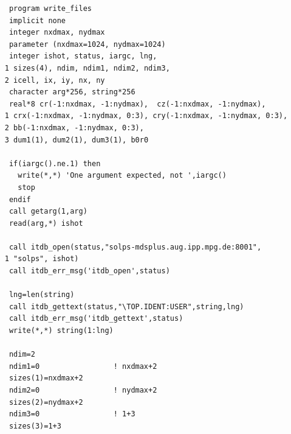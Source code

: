 \documentclass[a4paper,10pt]{report}
\begin{document}
\begin{verbatim}
      program write_files
      implicit none
      integer nxdmax, nydmax
      parameter (nxdmax=1024, nydmax=1024)
      integer ishot, status, iargc, lng,
     1 sizes(4), ndim, ndim1, ndim2, ndim3,
     2 icell, ix, iy, nx, ny
      character arg*256, string*256
      real*8 cr(-1:nxdmax, -1:nydmax),  cz(-1:nxdmax, -1:nydmax),
     1 crx(-1:nxdmax, -1:nydmax, 0:3), cry(-1:nxdmax, -1:nydmax, 0:3),
     2 bb(-1:nxdmax, -1:nydmax, 0:3),
     3 dum1(1), dum2(1), dum3(1), b0r0

      if(iargc().ne.1) then
        write(*,*) 'One argument expected, not ',iargc()
        stop
      endif
      call getarg(1,arg)
      read(arg,*) ishot

      call itdb_open(status,"solps-mdsplus.aug.ipp.mpg.de:8001",
     1 "solps", ishot)
      call itdb_err_msg('itdb_open',status)

      lng=len(string)
      call itdb_gettext(status,"\TOP.IDENT:USER",string,lng)
      call itdb_err_msg('itdb_gettext',status)
      write(*,*) string(1:lng)

      ndim=2
      ndim1=0                 ! nxdmax+2
      sizes(1)=nxdmax+2
      ndim2=0                 ! nydmax+2
      sizes(2)=nydmax+2
      ndim3=0                 ! 1+3
      sizes(3)=1+3


\end{verbatim}
\end{document}
